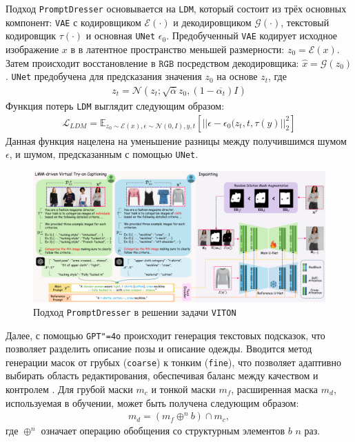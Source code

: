 Подход \texttt{PromptDresser} основывается на \texttt{LDM}, который состоит из трёх основных компонент: \texttt{VAE} с кодировщиком $\mathcal{E}(\cdot)$ и декодировщиком $\mathcal{G}(\cdot)$, текстовый кодировщик $\tau(\cdot)$ и основная \texttt{UNet} $\epsilon_0$. Предобученный \texttt{VAE} кодирует исходное изображение $x$ в в латентное пространство меньшей размерности: $z_0 = \mathcal{E}(x)$. Затем происходит восстановление в $\texttt{RGB}$ посредством декодировщика: $\hat{x} = \mathcal{G}(z_0)$. \texttt{UNet} предобучена для предсказания значения $z_0$ на основе $z_t$, где 
\begin{gather}
    z_t = \mathcal{N}(z_t; \sqrt{\overline{\alpha}}z_0, (1 - \overline{\alpha_t})I)
\end{gather}
Функция потерь \texttt{LDM} выглядит следующим образом:
\begin{gather}
    \mathcal{L}_{LDM} = \mathbb{E}_{z_0 \sim \mathcal{E}(x), \epsilon \sim \mathcal{N}(0, I), y, t}[||\epsilon - \epsilon_0 (z_t, t, \tau(y)||_2^2]
\end{gather}
Данная функция нацелена на уменьшение разницы между получившимся шумом $\epsilon$, и шумом, предсказанным с помощью \texttt{UNet}.
\begin{figure}[H]
    \centering
    \includegraphics[width=0.95\linewidth]{images/prompt_pipeline.png}
    \caption{Подход \texttt{PromptDresser} в решении задачи \texttt{VITON}}
    \label{fig:prompt_pipeline}
\end{figure}
Далее, с помощью \texttt{GPT"=4o} происходит генерация текстовых подсказок, что позволяет разделить описание позы и описание одежды. Вводится метод генерации масок от грубых (\texttt{coarse}) к тонким (\texttt{fine}), что позволяет адаптивно выбирать область редактирования, обеспечивая баланс между качеством и контролем \cite{promptdresser}. Для грубой маски $m_c$ и тонкой маски $m_f$, расширенная маска $m_d$, используемая в обучении, может быть получена следующим образом:
\begin{gather}
    m_d = (m_f \oplus^n b) \cap m_c,
\end{gather}
где $\oplus^n$ означает операцию обобщения со структурным элементов $b$ $n$ раз.